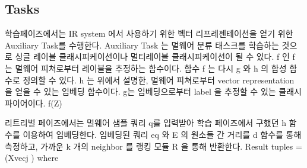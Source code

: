 \subsection{Tasks}

학습페이즈에서는 IR system 에서 사용하기 위한 벡터 리프레젠테이션을 얻기 위한 Auxiliary Task를 수행한다. Auxiliary Task 는 멀웨어 분류 태스크를 학습하는 것으로 싱글 레이블 클래시피케이션이나 멀티레이블 클래시피케이션이 될 수 있다. f 인 f 는 멀웨어 피쳐로부터 레이블을 추정하는 함수이다. 함수 f 는 다시 g 와 h 의 합성 함수로 정의할 수 있다. h 는 위에서 설명한, 멀웨어 피쳐로부터 vector representation 을 얻을 수 있는 임베딩 함수이다. g는 임베딩으로부터 label 을 추정할 수 있는 클래시파이어이다.  
f(Z)

리트리벌 페이즈에서는 멀웨어 샘플 쿼리 q를 입력받아 학습 페이즈에서 구했던 h 함수를 이용하여 임베딩한다. 임베딩된 쿼리 eq 와 E 의 원소들 간 거리를 d 함수를 통해 측정하고, 가까운 k 개의 neighbor 를 랭킹 모듈 R 을 통해 반환한다. 
Result tuples = (Xvecj ) where


